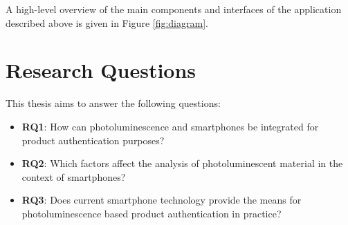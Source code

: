 \documentclass[thesis.tex]{subfiles}
\begin{document}
A high-level overview of the main components and interfaces of the application described above is given in Figure \ref{fig:diagram}.

\section{Research Questions}

This thesis aims to answer the following questions:

\begin{itemize}
  \item \textbf{RQ1}: How can photoluminescence and smartphones be integrated for product authentication purposes?
  \item \textbf{RQ2}: Which factors affect the analysis of photoluminescent material in the context of smartphones?
  \item \textbf{RQ3}: Does current smartphone technology provide the means for photoluminescence based product authentication in practice?
\end{itemize}
\end{document}
